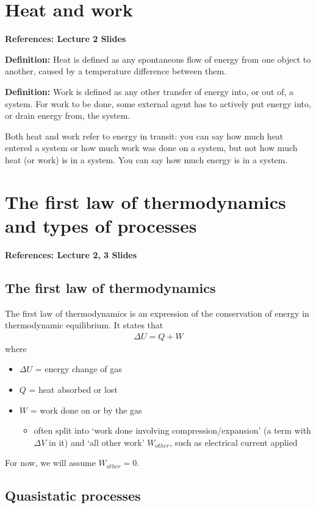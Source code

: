 \documentclass[11pt]{article}
\begin{document}
\section{Heat and work}
\textbf{References: Lecture 2 Slides} \bigskip 

\textbf{Definition:} Heat is defined as any spontaneous flow of energy from one object to another, caused by a temperature difference between them. 

\textbf{Definition:} Work is defined as any other transfer of energy into, or out of, a system. For work to be done, some external agent has to actively put energy into, or drain energy from, the system. 

Both heat and work refer to energy in transit: you can say how much heat entered a system or how much work was done on a system, but not how much heat (or work) is in a system. You can say how much energy is in a system. 


\section{The first law of thermodynamics and types of processes}
\textbf{References: Lecture 2, 3 Slides}
\subsection{The first law of thermodynamics}
The first law of thermodynamics is an expression of the conservation of energy in thermodynamic equilibrium. It states that 
\begin{align*}
    \Delta U = Q + W 
\end{align*}
where 
\begin{itemize}
    \item $\Delta U$ = energy change of gas
    \item $Q$ = heat absorbed or lost 
    \item $W$ = work done on or by the gas 
    \begin{itemize}
        \item often split into `work done involving compression/expansion' (a term with $\Delta V$ in it) and `all other work' $W_{other}$, such as electrical current applied 
    \end{itemize}
\end{itemize}
For now, we will assume $W_{other}= 0$. 

\subsection{Quasistatic processes}
\end{document}
